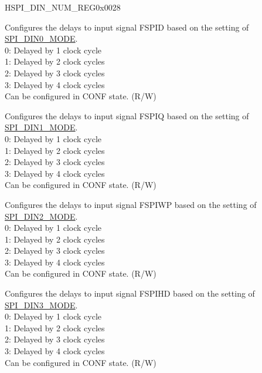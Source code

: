 \begin{register}{H}{SPI\_DIN\_NUM\_REG}{0x0028}\label{regdesc:SPIDINNUMREG}
%
%
%
%
%
\regnewline%
\begin{regdesc}\begin{reglist}
\label{fielddesc:SPIDIN0NUM}\item [SPI\_DIN0\_NUM] Configures the delays to input signal FSPID based on the setting of \hyperref[fielddesc:SPIDIN0MODE]{SPI\_DIN0\_MODE}. \\
0: Delayed by 1 clock cycle \\
1: Delayed by 2 clock cycles \\
2: Delayed by 3 clock cycles \\
3: Delayed by 4 clock cycles \\
Can be configured in CONF state. (R/W)
\label{fielddesc:SPIDIN1NUM}\item [SPI\_DIN1\_NUM] Configures the delays to input signal FSPIQ based on the setting of \hyperref[fielddesc:SPIDIN1MODE]{SPI\_DIN1\_MODE}. \\
0: Delayed by 1 clock cycle \\
1: Delayed by 2 clock cycles \\
2: Delayed by 3 clock cycles \\
3: Delayed by 4 clock cycles \\
Can be configured in CONF state. (R/W)
\label{fielddesc:SPIDIN2NUM}\item [SPI\_DIN2\_NUM] Configures the delays to input signal FSPIWP based on the setting of \hyperref[fielddesc:SPIDIN2MODE]{SPI\_DIN2\_MODE}. \\
0: Delayed by 1 clock cycle \\
1: Delayed by 2 clock cycles \\
2: Delayed by 3 clock cycles \\
3: Delayed by 4 clock cycles \\
Can be configured in CONF state. (R/W)
\label{fielddesc:SPIDIN3NUM}\item [SPI\_DIN3\_NUM] Configures the delays to input signal FSPIHD based on the setting of \hyperref[fielddesc:SPIDIN3MODE]{SPI\_DIN3\_MODE}. \\
0: Delayed by 1 clock cycle \\
1: Delayed by 2 clock cycles \\
2: Delayed by 3 clock cycles \\
3: Delayed by 4 clock cycles \\
Can be configured in CONF state. (R/W)
\end{reglist}\end{regdesc}
\end{register}


